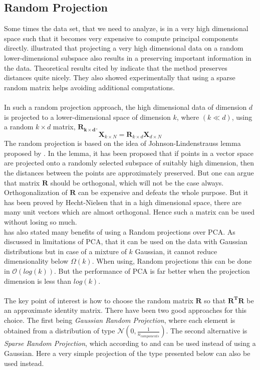 \subsection{Random Projection}
Some times the data set, that we need to analyze, is in a very high dimensional space such that it becomes very expensive to compute principal components directly. \cite{bingham2001random} illustrated that projecting a very high dimensional data on a random lower-dimensional subspace also results in a preserving important information in the data. Theoretical results cited by \cite{bingham2001random} indicate that the method preserves distances quite nicely. They also showed experimentally that using a sparse random matrix helps avoiding additional computations.\\\\
In such a random projection approach, the high dimensional data of dimension $d$ is projected to a lower-dimensional space of dimension $k$, where $(k \ll d)$, using a random $ k \times d$ matrix, $\mathbf{R_{k\times d}}$.
\begin{equation}
	 \mathbf{X}_{k\times N} = \mathbf{R}_{k\times d} \mathbf{X}_{d\times N}
\end{equation}
The random projection is based on the idea of Johnson-Lindenstrauss lemma proposed by \cite{johnson1984extensions}. In the lemma, it has been proposed that if points in a vector space are projected onto a randomly selected subspace of suitably high dimension, then the distances between the points are approximately preserved. But one can argue that matrix $ \mathbf{R} $ should be orthogonal, which will not be the case always. Orthogonalization of $ \mathbf{R} $ can be expensive and defeats the whole purpose. But it has been proved by Hecht-Nielsen that in a high dimensional space, there are many unit vectors which are almost orthogonal. Hence such a matrix can be used without losing so much.\\
\cite{dasgupta2000experiments} has also stated many benefits of using a Random projections over PCA. As discussed in limitations of PCA, that it can be used on the data with Gaussian distributions but in case of a mixture of $ \mathit{k}$ Gaussian, it cannot reduce dimensionality below $\Omega(k) $. When using, Random projections this can be done in $\mathcal{O}(log(k))$. But the performance of PCA is far better when the projection dimension is less than $log(k)$.\\\\
The key point of interest is how to choose the random matrix $ \mathbf{R} $ so that $ \mathbf{R^T R} $ be an approximate identity matrix. There have been two good approaches for this choice. The first being \textit{Gaussian Random Projection}, where each element is obtained from a distribution of type $\mathcal{N}(0, \frac{1}{n_{components}})$. The second alternative is \textit{Sparse Random Projection}, which according to \cite{achlioptas2001database} and \cite{li2006very} can be used instead of using a Gaussian. Here a very simple projection of the type presented below can also be used instead.
